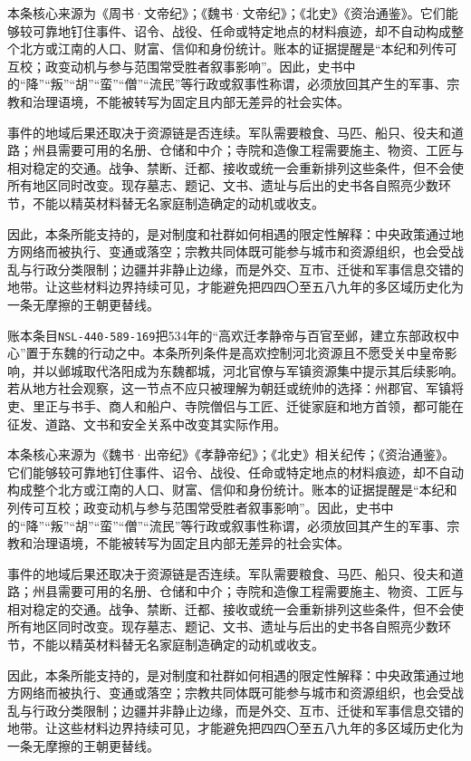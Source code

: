 本条核心来源为《周书·文帝纪》；《魏书·文帝纪》；《北史》《资治通鉴》。它们能够较可靠地钉住事件、诏令、战役、任命或特定地点的材料痕迹，却不自动构成整个北方或江南的人口、财富、信仰和身份统计。账本的证据提醒是“本纪和列传可互校；政变动机与参与范围常受胜者叙事影响”。因此，史书中的“降”“叛”“胡”“蛮”“僧”“流民”等行政或叙事性称谓，必须放回其产生的军事、宗教和治理语境，不能被转写为固定且内部无差异的社会实体。

事件的地域后果还取决于资源链是否连续。军队需要粮食、马匹、船只、役夫和道路；州县需要可用的名册、仓储和中介；寺院和造像工程需要施主、物资、工匠与相对稳定的交通。战争、禁断、迁都、接收或统一会重新排列这些条件，但不会使所有地区同时改变。现存墓志、题记、文书、遗址与后出的史书各自照亮少数环节，不能以精英材料替无名家庭制造确定的动机或收支。

因此，本条所能支持的，是对制度和社群如何相遇的限定性解释：中央政策通过地方网络而被执行、变通或落空；宗教共同体既可能参与城市和资源组织，也会受战乱与行政分类限制；边疆并非静止边缘，而是外交、互市、迁徙和军事信息交错的地带。让这些材料边界持续可见，才能避免把四四〇至五八九年的多区域历史化为一条无摩擦的王朝更替线。

账本条目\texttt{NSL-440-589-169}把534年的“高欢迁孝静帝与百官至邺，建立东部政权中心”置于东魏的行动之中。本条所列条件是高欢控制河北资源且不愿受关中皇帝影响，并以邺城取代洛阳成为东魏都城，河北官僚与军镇资源集中提示其后续影响。若从地方社会观察，这一节点不应只被理解为朝廷或统帅的选择：州郡官、军镇将吏、里正与书手、商人和船户、寺院僧侣与工匠、迁徙家庭和地方首领，都可能在征发、道路、文书和安全关系中改变其实际作用。

本条核心来源为《魏书·出帝纪》《孝静帝纪》；《北史》相关纪传；《资治通鉴》。它们能够较可靠地钉住事件、诏令、战役、任命或特定地点的材料痕迹，却不自动构成整个北方或江南的人口、财富、信仰和身份统计。账本的证据提醒是“本纪和列传可互校；政变动机与参与范围常受胜者叙事影响”。因此，史书中的“降”“叛”“胡”“蛮”“僧”“流民”等行政或叙事性称谓，必须放回其产生的军事、宗教和治理语境，不能被转写为固定且内部无差异的社会实体。

事件的地域后果还取决于资源链是否连续。军队需要粮食、马匹、船只、役夫和道路；州县需要可用的名册、仓储和中介；寺院和造像工程需要施主、物资、工匠与相对稳定的交通。战争、禁断、迁都、接收或统一会重新排列这些条件，但不会使所有地区同时改变。现存墓志、题记、文书、遗址与后出的史书各自照亮少数环节，不能以精英材料替无名家庭制造确定的动机或收支。

因此，本条所能支持的，是对制度和社群如何相遇的限定性解释：中央政策通过地方网络而被执行、变通或落空；宗教共同体既可能参与城市和资源组织，也会受战乱与行政分类限制；边疆并非静止边缘，而是外交、互市、迁徙和军事信息交错的地带。让这些材料边界持续可见，才能避免把四四〇至五八九年的多区域历史化为一条无摩擦的王朝更替线。

